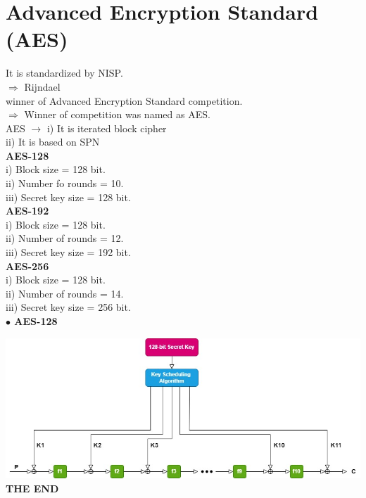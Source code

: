 \documentclass[11pt]{article}
\begin{document}
	\section{Advanced Encryption Standard (AES)}
	It is standardized by NISP.\\
	$\Rightarrow$ Rijndael \\winner of Advanced Encryption Standard competition.\\
	$\Rightarrow$ Winner of competition was named as AES.\\
	AES $\rightarrow$ i) It is iterated block cipher\\
	\hspace*{1.4cm}ii) It is based on SPN\vspace{0.3cm}\\
	\textbf{AES-128}\\
	i) Block size = 128 bit.\\
	ii) Number fo rounds = 10.\\
	iii) Secret key size = 128 bit.\vspace{0.3cm}\\
	\textbf{AES-192}\\
	i) Block size = 128 bit.\\
	ii) Number of rounds = 12.\\
	iii) Secret key size = 192 bit.\vspace{0.3cm}\\
	\textbf{AES-256}\\
	i) Block size = 128 bit.\\
	ii) Number of rounds = 14.\\
	iii) Secret key size = 256 bit.\vspace{0.3cm}\\
	\textbf{$\bullet$ AES-128}\vspace{0.3cm}\\
	\begin{center}
		\includegraphics[width=17cm]{AES-128 (1).jpg}\vspace{10.5cm}\\
		\textbf{THE END}
	\end{center}
	
\end{document}
